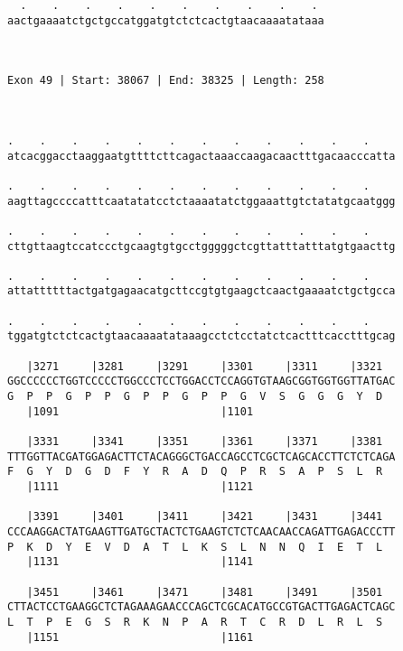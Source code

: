 \documentclass{article}
\begin{document}
\begin{Verbatim}
  .    .    .    .    .    .    .    .    .    . 
aactgaaaatctgctgccatggatgtctctcactgtaacaaaatataaa
                                                 
                                                 
 
Exon 49 | Start: 38067 | End: 38325 | Length: 258



.    .    .    .    .    .    .    .    .    .    .    .    
atcacggacctaaggaatgttttcttcagactaaaccaagacaactttgacaacccatta
                                                            
.    .    .    .    .    .    .    .    .    .    .    .    
aagttagccccatttcaatatatcctctaaaatatctggaaattgtctatatgcaatggg
                                                            
.    .    .    .    .    .    .    .    .    .    .    .    
cttgttaagtccatccctgcaagtgtgcctgggggctcgttatttatttatgtgaacttg
                                                            
.    .    .    .    .    .    .    .    .    .    .    .    
attattttttactgatgagaacatgcttccgtgtgaagctcaactgaaaatctgctgcca
                                                            
.    .    .    .    .    .    .    .    .    .    .    .    
tggatgtctctcactgtaacaaaatataaagcctctcctatctcactttcacctttgcag
                                                            
   |3271     |3281     |3291     |3301     |3311     |3321  
GGCCCCCCTGGTCCCCCTGGCCCTCCTGGACCTCCAGGTGTAAGCGGTGGTGGTTATGAC
G  P  P  G  P  P  G  P  P  G  P  P  G  V  S  G  G  G  Y  D  
   |1091                         |1101                      
  
   |3331     |3341     |3351     |3361     |3371     |3381  
TTTGGTTACGATGGAGACTTCTACAGGGCTGACCAGCCTCGCTCAGCACCTTCTCTCAGA
F  G  Y  D  G  D  F  Y  R  A  D  Q  P  R  S  A  P  S  L  R  
   |1111                         |1121                      
  
   |3391     |3401     |3411     |3421     |3431     |3441  
CCCAAGGACTATGAAGTTGATGCTACTCTGAAGTCTCTCAACAACCAGATTGAGACCCTT
P  K  D  Y  E  V  D  A  T  L  K  S  L  N  N  Q  I  E  T  L  
   |1131                         |1141                      
  
   |3451     |3461     |3471     |3481     |3491     |3501  
CTTACTCCTGAAGGCTCTAGAAAGAACCCAGCTCGCACATGCCGTGACTTGAGACTCAGC
L  T  P  E  G  S  R  K  N  P  A  R  T  C  R  D  L  R  L  S  
   |1151                         |1161                      
  

\end{Verbatim}
\end{document}
